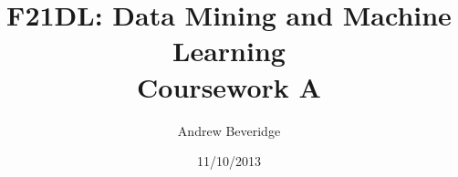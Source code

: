%
%
% 
%
\begin{titlepage}
\title{F21DL: Data Mining and Machine Learning \\\Large{Coursework A}}
\author{
	Andrew Beveridge\\
}
\date{11/10/2013}
\maketitle
\thispagestyle{empty}
\end{titlepage}
